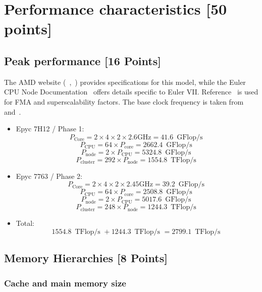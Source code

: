 \documentclass[unicode,10pt,a4paper,oneside,numbers=endperiod,openany]{scrartcl}
\begin{document}
\section{Performance characteristics [50 points]}

\subsection{Peak performance [16 Points]}

The AMD website (~\cite{amd_epyc_7763_spec},~\cite{amd_epyc_7H12_spec}) provides specifications for this model, while the Euler CPU Node Documentation~\cite{euler_docs} offers details specific to Euler VII. Reference~\cite{uops} is used for FMA and superscalability factors. The base clock frequency is taken from~\cite{amd_epyc_7H12_spec} and~\cite{amd_epyc_7763_spec}.

\begin{itemize}
\item Epyc 7H12 / Phase 1: \[P_{\mathrm{\text{Core}}} = 2 \times 4 \times 2 \times 2.6\mathrm{\text{GHz}} = 41.6\,\text{ GFlop/s }\] \[P_{\mathrm{\text{CPU}}} = 64 \times P_{\mathrm{\text{core}}} = 2662.4\,\text{ GFlop/s }\] \[P_{\mathrm{\text{node}}} = 2 \times P_{\mathrm{\text{CPU}}} = 5324.8\,\text{ GFlop/s }\] \[P_{\mathrm{\text{cluster}}} = 292 \times P_{\mathrm{\text{node}}} = 1554.8\,\text{ TFlop/s }\]


\item Epyc 7763 / Phase 2: \[P_{\mathrm{\text{Core}}} = 2 \times 4 \times 2 \times 2.45\mathrm{\text{GHz}} = 39.2\,\text{ GFlop/s }\] \[P_{\mathrm{\text{CPU}}} = 64 \times P_{\mathrm{\text{core}}} = 2508.8\,\text{ GFlop/s }\] \[P_{\mathrm{\text{node}}} = 2 \times P_{\mathrm{\text{CPU}}} = 5017.6\,\text{ GFlop/s }\] \[P_{\mathrm{\text{cluster}}} = 248 \times P_{\mathrm{\text{node}}} = 1244.3\,\text{ TFlop/s }\]


\item Total: \[1554.8\,\text{ TFlop/s } + 1244.3\,\text{ TFlop/s } = 2799.1\,\text{ TFlop/s }\]
\end{itemize}

\subsection{Memory Hierarchies [8 Points]}

\subsubsection{Cache and main memory size}
\end{document}
